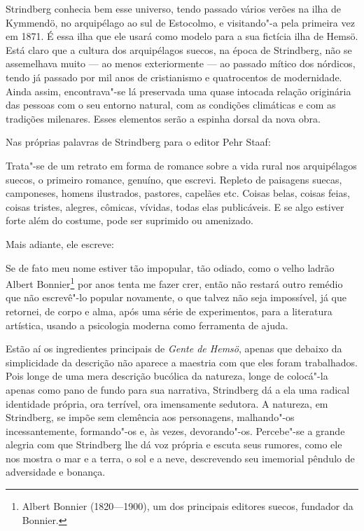 Strindberg conhecia bem esse universo, tendo passado vários verões na
ilha de Kymmendö, no arquipélago ao sul de Estocolmo, e visitando"-a
pela primeira vez em 1871. É essa ilha que ele usará como modelo para a
sua fictícia ilha de Hemsö. Está claro que a cultura dos arquipélagos suecos,
na época de Strindberg, não se assemelhava muito --- ao menos exteriormente ---
ao passado mítico dos nórdicos, tendo já passado por mil anos de cristianismo
e quatrocentos de modernidade.  Ainda assim, encontrava"-se lá
preservada uma quase intocada relação originária das pessoas com o seu
entorno natural, com as condições climáticas e com as tradições milenares. Esses
elementos serão a espinha dorsal da nova obra. 

Nas próprias palavras de Strindberg para o editor Pehr Staaf:

\begin{hedraquote}
Trata"-se de um retrato em forma de romance sobre a vida rural
nos arquipélagos suecos, o primeiro romance, genuíno, que escrevi.
Repleto de paisagens suecas, camponeses, homens ilustrados, pastores,
capelães etc. Coisas belas, coisas feias, coisas tristes, alegres,
cômicas, vívidas, todas elas publicáveis. E se algo estiver forte além
do costume, pode ser suprimido ou amenizado.
\end{hedraquote}

Mais adiante, ele escreve:

\begin{hedraquote}
Se de fato meu nome estiver tão impopular, tão odiado, como o
velho ladrão Albert Bonnier\footnote{ Albert Bonnier (1820---1900), um 
dos principais editores suecos, fundador da Bonnier.} por anos tenta me fazer crer, então não restará outro
remédio que não escrevê"-lo popular novamente, o que talvez não seja  %
impossível, já que retornei, de corpo e alma, após uma série de
experimentos, para a literatura artística, usando a psicologia
moderna como ferramenta de ajuda.
\end{hedraquote}

Estão aí os ingredientes principais de \textit{Gente de Hemsö},
apenas que debaixo da simplicidade da descrição não aparece a
maestria com que eles foram trabalhados. Pois longe de uma mera
descrição bucólica da natureza, longe de colocá"-la apenas como pano de
fundo para sua narrativa, Strindberg dá a ela uma radical identidade
própria, ora terrível, ora imensamente sedutora. A natureza, em
Strindberg, se impõe sem clemência aos personagens, malhando"-os
incessantemente, formando"-os e, às vezes, devorando"-os. Percebe"-se a
grande alegria com que Strindberg lhe dá voz própria e escuta seus
rumores, como ele nos mostra o mar e a terra, o sol e a neve, descrevendo
seu imemorial pêndulo de adversidade e bonança. 

